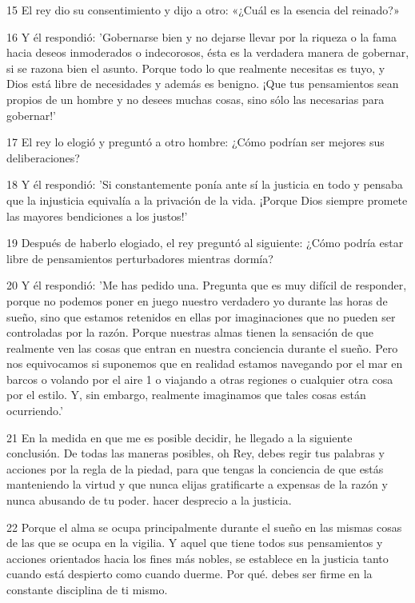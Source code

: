 \par 15 El rey dio su consentimiento y dijo a otro: «¿Cuál es la esencia del reinado?»

\par 16 Y él respondió: 'Gobernarse bien y no dejarse llevar por la riqueza o la fama hacia deseos inmoderados o indecorosos, ésta es la verdadera manera de gobernar, si se razona bien el asunto. Porque todo lo que realmente necesitas es tuyo, y Dios está libre de necesidades y además es benigno. ¡Que tus pensamientos sean propios de un hombre y no desees muchas cosas, sino sólo las necesarias para gobernar!'

\par 17 El rey lo elogió y preguntó a otro hombre: ¿Cómo podrían ser mejores sus deliberaciones?

\par 18 Y él respondió: 'Si constantemente ponía ante sí la justicia en todo y pensaba que la injusticia equivalía a la privación de la vida. ¡Porque Dios siempre promete las mayores bendiciones a los justos!'

\par 19 Después de haberlo elogiado, el rey preguntó al siguiente: ¿Cómo podría estar libre de pensamientos perturbadores mientras dormía?

\par 20 Y él respondió: 'Me has pedido una. Pregunta que es muy difícil de responder, porque no podemos poner en juego nuestro verdadero yo durante las horas de sueño, sino que estamos retenidos en ellas por imaginaciones que no pueden ser controladas por la razón. Porque nuestras almas tienen la sensación de que realmente ven las cosas que entran en nuestra conciencia durante el sueño. Pero nos equivocamos si suponemos que en realidad estamos navegando por el mar en barcos o volando por el aire 1 o viajando a otras regiones o cualquier otra cosa por el estilo. Y, sin embargo, realmente imaginamos que tales cosas están ocurriendo.'

\par 21 En la medida en que me es posible decidir, he llegado a la siguiente conclusión. De todas las maneras posibles, oh Rey, debes regir tus palabras y acciones por la regla de la piedad, para que tengas la conciencia de que estás manteniendo la virtud y que nunca elijas gratificarte a expensas de la razón y nunca abusando de tu poder. hacer desprecio a la justicia.

\par 22 Porque el alma se ocupa principalmente durante el sueño en las mismas cosas de las que se ocupa en la vigilia. Y aquel que tiene todos sus pensamientos y acciones orientados hacia los fines más nobles, se establece en la justicia tanto cuando está despierto como cuando duerme. Por qué. debes ser firme en la constante disciplina de ti mismo.

